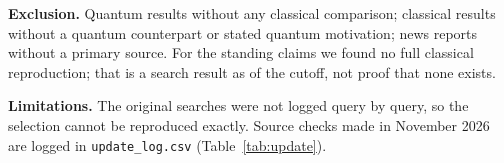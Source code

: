\textbf{Exclusion.} Quantum results without any classical comparison; classical results without a quantum counterpart or stated quantum motivation; news reports without a primary source. For the standing claims we found no full classical reproduction; that is a search result as of the cutoff, not proof that none exists.

\textbf{Limitations.} The original searches were not logged query by query, so the selection cannot be reproduced exactly. Source checks made in November 2026 are logged in \texttt{update\_log.csv} (Table~\ref{tab:update}).


